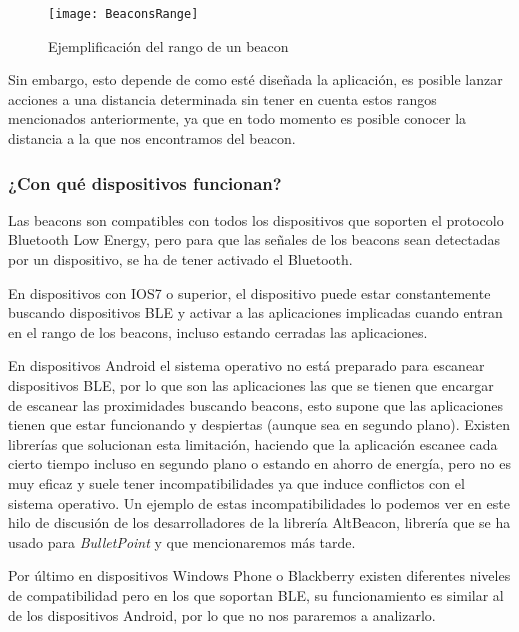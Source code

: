 \begin{figure}[h]
	\centering
	\texttt{[image: BeaconsRange]}
	\caption{Ejemplificación del rango de un beacon}
	\label{fig:beaconRange}
\end{figure}

Sin embargo, esto depende de como esté diseñada la aplicación, es posible lanzar acciones a una distancia determinada sin tener en cuenta estos rangos mencionados anteriormente, ya que en todo momento es posible conocer la distancia a la que nos encontramos del beacon.

\subsubsection{¿Con qué dispositivos funcionan?}

Las beacons son compatibles con todos los dispositivos que soporten el protocolo Bluetooth Low Energy, pero para que las señales de los beacons sean detectadas por un dispositivo, se ha de tener activado el Bluetooth. 


En dispositivos con IOS7 \cite{URL::IOS7} o superior, el dispositivo puede estar constantemente buscando dispositivos BLE y activar a las aplicaciones implicadas cuando entran en el rango de los beacons, incluso estando cerradas las aplicaciones.


En dispositivos Android \cite{URL::Android} el sistema operativo no está preparado para escanear dispositivos BLE, por lo que son las aplicaciones las que se tienen que encargar de escanear las proximidades buscando beacons, esto supone que las aplicaciones tienen que estar funcionando y despiertas (aunque sea en segundo plano). Existen librerías que solucionan esta limitación, haciendo que la aplicación escanee cada cierto tiempo incluso en segundo plano o estando en ahorro de energía, pero no es muy eficaz y suele tener incompatibilidades ya que induce conflictos con el sistema operativo. Un ejemplo de estas incompatibilidades lo podemos ver en este hilo de discusión \cite{URL::Incompatibilidades} de los desarrolladores de la librería AltBeacon, librería que se ha usado para \textit{BulletPoint} y que mencionaremos más tarde.

Por último en dispositivos Windows Phone \cite{URL:WindowsPhone} o Blackberry \cite{URL:Blackberry} existen diferentes niveles de compatibilidad pero en los que soportan BLE, su funcionamiento es similar al de los dispositivos Android, por lo que no nos pararemos a analizarlo. 


